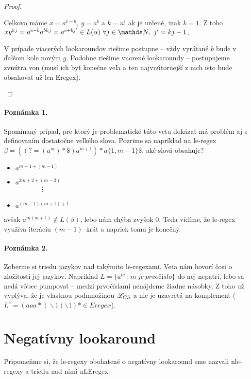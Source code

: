 \begin{proof}
\begin{enumerate}
Celkovo máme $x=a^{e-b},~y=a^b$ a $k = n!$ ak je určené, inak $k=1$. Z toho $xy^{kj} = a^{e-b}a^{bkj} = a^{e+bj'} \in L(\alpha) ~ \forall j \in \N, ~ j' = kj-1$. 

V prípade viacerých lookaroundov riešime postupne -- vždy vyrátané $b$ bude v ďalšom kole novým $g$. Podobne riešime vnorené lookaroundy -- postupujeme zvnútra von (musí ich byť konečne veľa a ten najvnútornejší z nich isto bude obsahovať už len Eregex).
\end{enumerate} 
\end{proof}

\paragraph{Poznámka 1.}
Spomínaný prípad, pre ktorý je problematické túto vetu dokázať má problém aj s definovaním dostatočne veľkého slova. Pozrime sa napríklad na le-regex $\beta = ((?=(a^m)*\mathdollar )a^{m+1})*a \lbrace 1,m-1 \rbrace \mathdollar$, aké slová obsahuje?
\begin{itemize}
\item $a^{m+1+(m-1)}$
\item $a^{2m+2+(m-2)}$ \\
	  ~~~~~~~\vdots
\item $a^{(m-1)(m+1)+1}$
\end{itemize}
avšak $a^{m(m+1)} \notin L(\beta )$, lebo nám chýba zvyšok $0$. Teda vidíme, že le-regex využíva iteráciu $(m-1)$--krát a napriek tomu je konečný.

\paragraph{Poznámka 2.}
Zoberme si triedu jazykov nad takýmito le-regexami. Veta nám hovorí čosi o zložitosti jej jazykov. Napriklad $L = \lbrace a^m ~|~ m~je~prvočíslo\rbrace$ do nej nepatrí, lebo sa nedá vôbec pumpovať -- medzi prvočíslami nenájdeme žiadne násobky. Z toho už vyplýva, že je vlastnou podmnožinou $\mathscr{L}_{CS}$ a nie je uzavretá na komplement ($L^c = (aaa*)\backslash 1(\backslash1)* \in Eregex$).

\section{Negatívny lookaround}\label{chap:negla}

Pripomeňme si, že le-regexy obohatené o negatívny lookaround sme nazvali nle-regexy a triedu nad nimi nLEregex.


